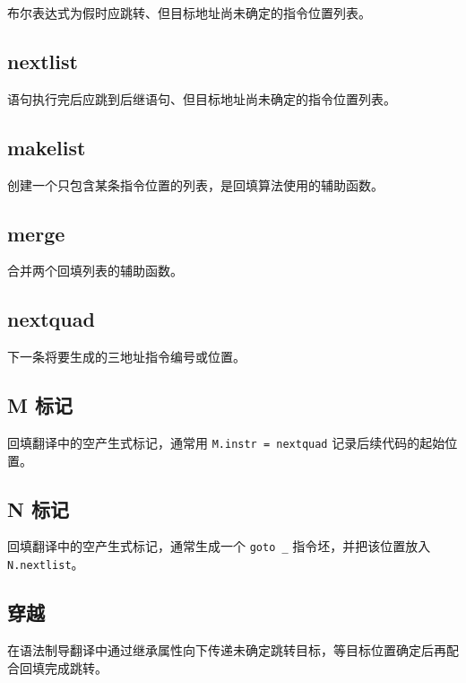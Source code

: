 \documentclass[UTF8,zihao=-4]{ctexart}
\begin{document}
布尔表达式为假时应跳转、但目标地址尚未确定的指令位置列表。

\subsection*{nextlist}

语句执行完后应跳到后继语句、但目标地址尚未确定的指令位置列表。

\subsection*{makelist}

创建一个只包含某条指令位置的列表，是回填算法使用的辅助函数。

\subsection*{merge}

合并两个回填列表的辅助函数。

\subsection*{nextquad}

下一条将要生成的三地址指令编号或位置。

\subsection*{M 标记}

回填翻译中的空产生式标记，通常用 \texttt{M.instr = nextquad} 记录后续代码的起始位置。

\subsection*{N 标记}

回填翻译中的空产生式标记，通常生成一个 \texttt{goto \_} 指令坯，并把该位置放入 \texttt{N.nextlist}。

\subsection*{穿越}

在语法制导翻译中通过继承属性向下传递未确定跳转目标，等目标位置确定后再配合回填完成跳转。
\end{document}
